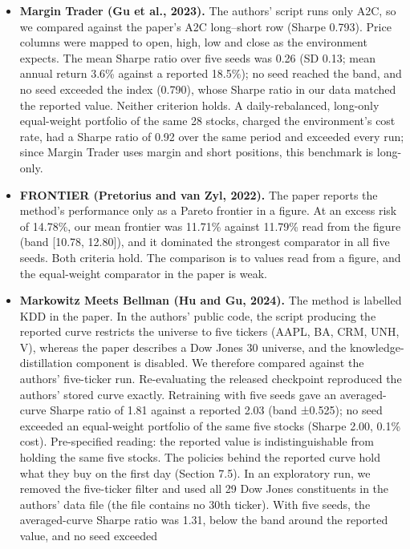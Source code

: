\documentclass[12pt,a4paper]{report}
\providecommand{\tightlist}{\setlength{\itemsep}{0pt}\setlength{\parskip}{0pt}}
\begin{document}
\begin{itemize}
\tightlist
\item
  \textbf{Margin Trader (Gu et al., 2023).} The authors' script runs
  only A2C, so we compared against the paper's A2C long--short row
  (Sharpe 0.793). Price columns were mapped to open, high, low and close
  as the environment expects. The mean Sharpe ratio over five seeds was
  0.26 (SD 0.13; mean annual return 3.6\% against a reported 18.5\%); no
  seed reached the band, and no seed exceeded the index (0.790), whose
  Sharpe ratio in our data matched the reported value. Neither criterion
  holds. A daily-rebalanced, long-only equal-weight portfolio of the
  same 28 stocks, charged the environment's cost rate, had a Sharpe
  ratio of 0.92 over the same period and exceeded every run; since
  Margin Trader uses margin and short positions, this benchmark is
  long-only.
\item
  \textbf{FRONTIER (Pretorius and van Zyl, 2022).} The paper reports the
  method's performance only as a Pareto frontier in a figure. At an
  excess risk of 14.78\%, our mean frontier was 11.71\% against 11.79\%
  read from the figure (band {[}10.78, 12.80{]}), and it dominated the
  strongest comparator in all five seeds. Both criteria hold. The
  comparison is to values read from a figure, and the equal-weight
  comparator in the paper is weak.
\item
  \textbf{Markowitz Meets Bellman (Hu and Gu, 2024).} The method is
  labelled KDD in the paper. In the authors' public code, the script
  producing the reported curve restricts the universe to five tickers
  (AAPL, BA, CRM, UNH, V), whereas the paper describes a Dow Jones 30
  universe, and the knowledge-distillation component is disabled. We
  therefore compared against the authors' five-ticker run. Re-evaluating
  the released checkpoint reproduced the authors' stored curve exactly.
  Retraining with five seeds gave an averaged-curve Sharpe ratio of 1.81
  against a reported 2.03 (band ±0.525); no seed exceeded an
  equal-weight portfolio of the same five stocks (Sharpe 2.00, 0.1\%
  cost). Pre-specified reading: the reported value is indistinguishable
  from holding the same five stocks. The policies behind the reported
  curve hold what they buy on the first day (Section 7.5). In an
  exploratory run, we removed the five-ticker filter and used all 29 Dow
  Jones constituents in the authors' data file (the file contains no
  30th ticker). With five seeds, the averaged-curve Sharpe ratio was
  1.31, below the band around the reported value, and no seed exceeded

\end{itemize}
\end{document}
